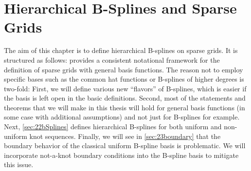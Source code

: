 
\chapter{Hierarchical B-Splines and Sparse Grids}
\label{sec:20sparseGrids}


The aim of this chapter is to define hierarchical B-splines on sparse grids.
It is structured as follows:
 provides a consistent notational framework
for the definition of sparse grids with general basis functions.
The reason not to employ specific bases such as the common hat functions
or B-splines of higher degrees is two-fold:
First, we will define various new ``flavors'' of B-splines,
which is easier if the basis is left open in the basic definitions.
Second, most of the statements and theorems that we will make in this
thesis will hold for general basis functions
(in some case with additional assumptions)
and not just for B-splines for example.
Next, \cref{sec:22bSplines} defines hierarchical B-splines for both
uniform and non-uniform knot sequences.
Finally, we will see in \cref{sec:23boundary} that the boundary behavior
of the classical uniform B-spline basis is problematic.
We will incorporate not-a-knot boundary conditions into the B-spline
basis to mitigate this issue.




